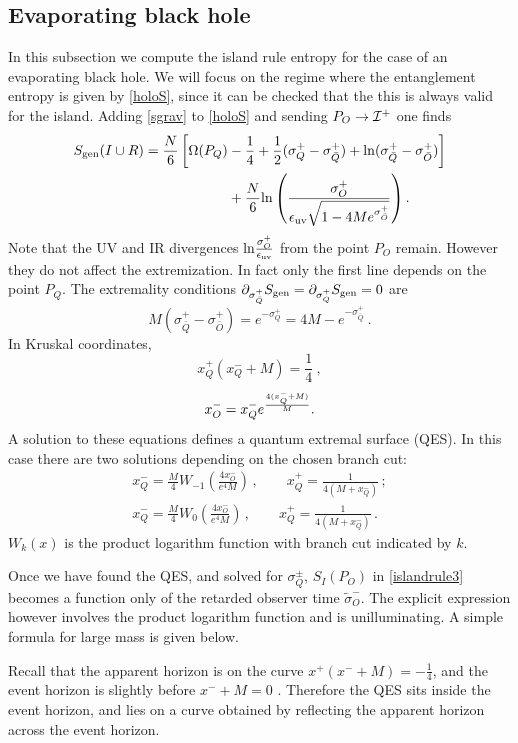 \documentclass[12pt,oneside,letterpaper]{article}
\newcommand{\p}{\partial}
\newcommand{\f}{\frac}
\newcommand{\be}{\begin{equation}}
\newcommand{\ee}{\end{equation}}
\def\be{\begin{eqnarray}}
\def\ee{\end{eqnarray}}
\let\s=\sigma \let\t=\tau \let\u=\upsilon \let\c=\chi
\let\f=\frac
\def\be{\begin{equation}}
\def\ee{\end{equation}}
\def\m{{M}}
\def\log{{\rm ln}}
\renewcommand{\p}{\partial}
\numberwithin{equation}{section}
\def \be {\begin{equation}}
\def \ee {\end{equation}}
\begin{document}
\subsection{Evaporating black hole}
In this subsection we compute the island rule entropy for the case of an evaporating black hole. We will focus on the regime where the entanglement entropy is given by \eqref{holoS}, since it can be checked that the this is always valid for the island.
Adding \eqref{sgrav} to \eqref{holoS} and sending  $P_O \to {\cal I}^+$ one finds  
\begin{align}\label{he}
S_{\rm gen}(I \cup R) &= \frac{N}{6}\left[\Omega(P_Q) -{1 \over 4}+  \frac{1}{2}(\s^+_{Q}  - \s^+_{\bar Q} ) + \log (\s^+_{\bar Q}  - \s^+_{\bar O} ) 
\right]  \\
& \qquad \qquad \qquad  + \frac{N}{6}\log \left( \frac{\s^+_{O} }{\epsilon_{\text{uv}}\sqrt{1-4\m e^{ \s^+_{\bar O} } }} \right). \notag
\end{align}
Note that the UV and IR divergences $\log \f{\s^+_O}{\epsilon_{\text{uv}}}$ from the point $P_O$ remain. However they do not affect the extremization. 
In fact only the first line depends on the point $P_Q$. The extremality conditions $\p_{\s^+_{\bar Q} }S_{\rm gen} = \p_{\s^+_{Q} } S_{\rm gen} = 0$ are
\be
\m(\s^+_{\bar Q}  - \s^+_{\bar O} ) = e^{- \s^+_{Q} }  = {4\m} - e^{- \s^+_{\bar Q} }  \ .
\ee
In Kruskal coordinates,
\be\label{kruskalQES}
x_Q^+  (x_Q^- + {\m}) = \frac{1}{4} \ , \ee
\be \label{xqo}x^-_O=x^-_Qe^{4(x^-_Q+\m )\over \m}.
\ee
A solution to these equations defines a quantum extremal surface (QES). In this case there are two solutions  depending on the chosen branch cut:
\begin{align}
x_Q^ - = \f{\m}{4}W_{-1}\left(\f{4x_O^- }{e^4\m}\right)\,,\qquad x_Q^+ = \f{1}{4(\m+x_Q^-)}\,;\label{domQES}\\
x_Q^ - = \f{\m}{4}W_0\left(\f{4x_O^- }{e^4\m}\right)\,,\qquad x_Q^+ = \f{1}{4(\m+x_Q^-)}\,.\label{subdomQES}
\end{align} 
$W_k(x)$ is the product logarithm function with branch cut indicated by $k$. 


Once we have found the QES, and solved for $\s^\pm_Q$, $S_I (P_O)$ in  \eqref{islandrule3} becomes a function only of the retarded observer time $\tilde \s^-_O$. The explicit expression however involves the product logarithm function and is unilluminating. A simple formula for large mass is given below. 


Recall that the apparent horizon is on the curve $x^+  (x^- + {\m}{}) = - \frac{1}{4}$, and the event horizon is slightly before $x^-+ {\m}{}=0$ . Therefore the QES sits inside the event horizon, and lies on a curve obtained by reflecting the apparent horizon across the event horizon.
\end{document}
